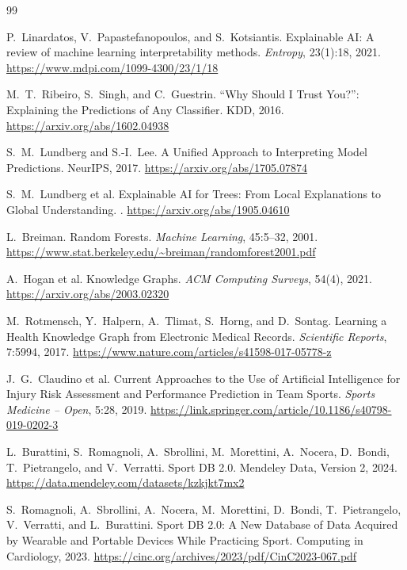 \documentclass[12pt,a4paper]{article}
\begin{document}

\begin{thebibliography}{99}

P.~Linardatos, V.~Papastefanopoulos, and S.~Kotsiantis.
\newblock Explainable AI: A review of machine learning interpretability methods.
\newblock \emph{Entropy}, 23(1):18, 2021.
\newblock \url{https://www.mdpi.com/1099-4300/23/1/18}

M.~T.~Ribeiro, S.~Singh, and C.~Guestrin.
\newblock ``Why Should I Trust You?'': Explaining the Predictions of Any Classifier.
\newblock KDD, 2016.
\newblock \url{https://arxiv.org/abs/1602.04938}

S.~M.~Lundberg and S.-I.~Lee.
\newblock A Unified Approach to Interpreting Model Predictions.
\newblock NeurIPS, 2017.
\newblock \url{https://arxiv.org/abs/1705.07874}

S.~M.~Lundberg et al.
\newblock Explainable AI for Trees: From Local Explanations to Global Understanding.
.
\newblock \url{https://arxiv.org/abs/1905.04610}

L.~Breiman.
\newblock Random Forests.
\newblock \emph{Machine Learning}, 45:5--32, 2001.
\newblock \url{https://www.stat.berkeley.edu/~breiman/randomforest2001.pdf}

A.~Hogan et al.
\newblock Knowledge Graphs.
\newblock \emph{ACM Computing Surveys}, 54(4), 2021.
\newblock \url{https://arxiv.org/abs/2003.02320}

M.~Rotmensch, Y.~Halpern, A.~Tlimat, S.~Horng, and D.~Sontag.
\newblock Learning a Health Knowledge Graph from Electronic Medical Records.
\newblock \emph{Scientific Reports}, 7:5994, 2017.
\newblock \url{https://www.nature.com/articles/s41598-017-05778-z}

J.~G.~Claudino et al.
\newblock Current Approaches to the Use of Artificial Intelligence for Injury Risk Assessment and Performance Prediction in Team Sports.
\newblock \emph{Sports Medicine -- Open}, 5:28, 2019.
\newblock \url{https://link.springer.com/article/10.1186/s40798-019-0202-3}

L.~Burattini, S.~Romagnoli, A.~Sbrollini, M.~Morettini, A.~Nocera,
D.~Bondi, T.~Pietrangelo, and V.~Verratti.
\newblock Sport DB 2.0.
\newblock Mendeley Data, Version 2, 2024.
\newblock \url{https://data.mendeley.com/datasets/kzkjkt7mx2}

S.~Romagnoli, A.~Sbrollini, A.~Nocera, M.~Morettini, D.~Bondi,
T.~Pietrangelo, V.~Verratti, and L.~Burattini.
\newblock Sport DB 2.0: A New Database of Data Acquired by Wearable and Portable Devices While Practicing Sport.
\newblock Computing in Cardiology, 2023.
\newblock \url{https://cinc.org/archives/2023/pdf/CinC2023-067.pdf}


\end{thebibliography}
\end{document}
